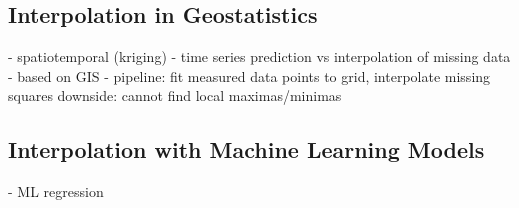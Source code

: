 \subsection{Interpolation in Geostatistics}

- spatiotemporal (kriging)
- time series prediction vs interpolation of missing data
- based on GIS 
- pipeline: fit measured data points to grid, interpolate missing squares
downside: cannot find local maximas/minimas

\subsection{Interpolation with Machine Learning Models}


- ML regression
